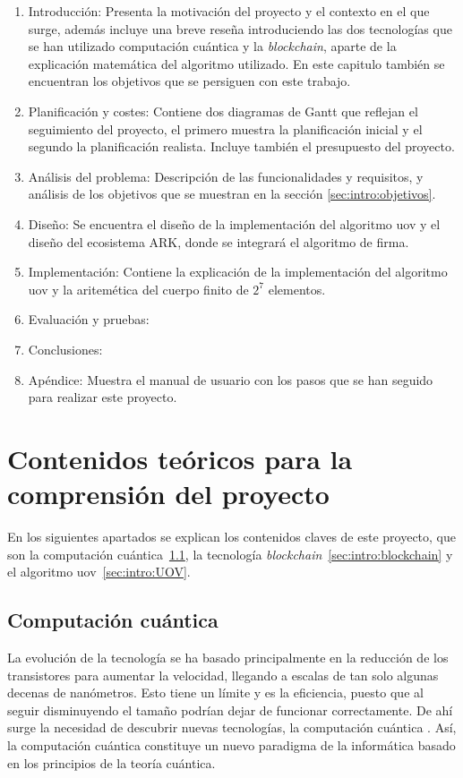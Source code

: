 \begin{enumerate}
	\item Introducción: Presenta la motivación del proyecto y el contexto en el que surge, además incluye una breve reseña introduciendo las dos tecnologías que se han utilizado computación cuántica y la \textit{blockchain}, aparte de la explicación matemática del algoritmo utilizado. En este capitulo también se encuentran los objetivos que se persiguen con este trabajo.
	\item Planificación y costes: Contiene dos diagramas de Gantt que reflejan el seguimiento del proyecto, el primero muestra la planificación inicial y el segundo la planificación realista. Incluye también el presupuesto del proyecto.
	\item Análisis del problema: Descripción de las funcionalidades y requisitos, y análisis de los objetivos que se muestran en la sección \ref{sec:intro:objetivos}.
	\item Diseño: Se encuentra el diseño de la implementación del algoritmo \acrshort{uov} y el diseño del ecosistema ARK, donde se integrará el algoritmo de firma.
	\item Implementación: Contiene la explicación de la implementación del algoritmo \acrshort{uov} y la aritemética del cuerpo finito de $2^7$ elementos.
	\item Evaluación y pruebas: 
	\item Conclusiones:
	\item Apéndice: Muestra el manual de usuario con los pasos que se han seguido para realizar este proyecto.
\end{enumerate}

\section{Contenidos teóricos para la comprensión del proyecto}

En los siguientes apartados se explican los contenidos claves de este proyecto, que son la computación cuántica\ \ref{sec:intro:cc}, la tecnología \textit{blockchain}\ \ref{sec:intro:blockchain} y el algoritmo \acrshort{uov}\ \ref{sec:intro:UOV}.

\subsection{Computación cuántica}\label{sec:intro:cc}

La evolución de la tecnología se ha basado principalmente en la reducción de los transistores para aumentar la velocidad, llegando a escalas de tan solo algunas decenas de nanómetros. Esto tiene un límite y es la eficiencia, puesto que al seguir disminuyendo el tamaño podrían dejar de funcionar correctamente. De ahí surge la necesidad de descubrir nuevas tecnologías, la computación cuántica \cite{computacion-cuantica-wiki}. Así, la computación cuántica constituye un nuevo paradigma de la informática basado en los principios de la teoría cuántica.\\

